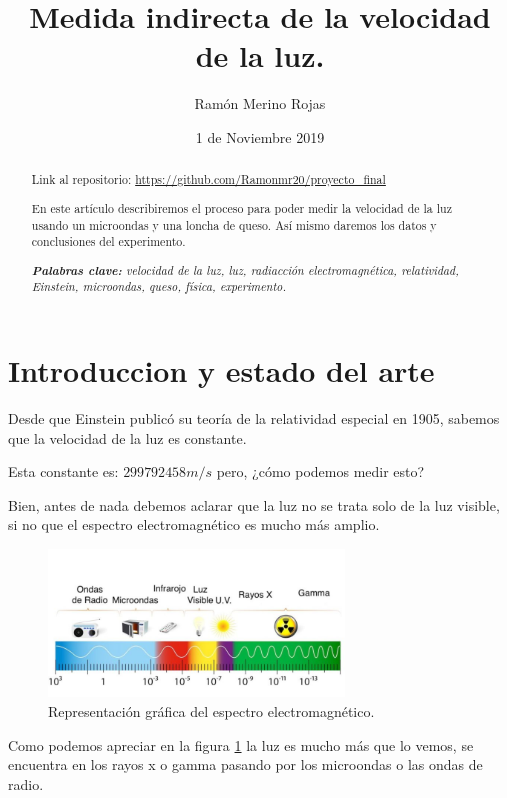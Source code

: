 \documentclass{article}
\title{Medida indirecta de la velocidad de la luz.}
\author{Ramón Merino Rojas}
\date{1 de Noviembre 2019}
\begin{document}
\maketitle

\begin{abstract}
Link al repositorio: \href{https://github.com/Ramonmr20/proyecto_final}{https://github.com/Ramonmr20/proyecto\_final}

En este artículo describiremos el proceso para poder medir la velocidad de la luz usando un microondas y una loncha de queso. Así mismo daremos los datos y conclusiones del experimento.

\textit{\textbf{Palabras clave:} velocidad de la luz, luz, radiacción electromagnética, relatividad, Einstein, microondas, queso, física, experimento.}
\end{abstract}


\tableofcontents

\newpage
\section{Introduccion y estado del arte}
Desde que Einstein publicó su teoría de la relatividad especial en 1905, sabemos que la velocidad de la luz es constante. \cite{Paterna1971}

Esta constante es: $299 792 458 m/s$ pero, ¿cómo podemos medir esto?

Bien, antes de nada debemos aclarar que la luz no se trata solo de la luz visible, si no que el espectro electromagnético es mucho más amplio.


\begin{figure}[H]
    \centering
    \includegraphics[width = 0.7\textwidth]{espectro}
    \caption{Representación gráfica del espectro electromagnético.}
    \label{fig:espectro}
\end{figure}

Como podemos apreciar en la figura \ref{fig:espectro} la luz es mucho más que lo vemos, se encuentra en los rayos x o gamma pasando por los microondas o las ondas de radio.
\end{document}

